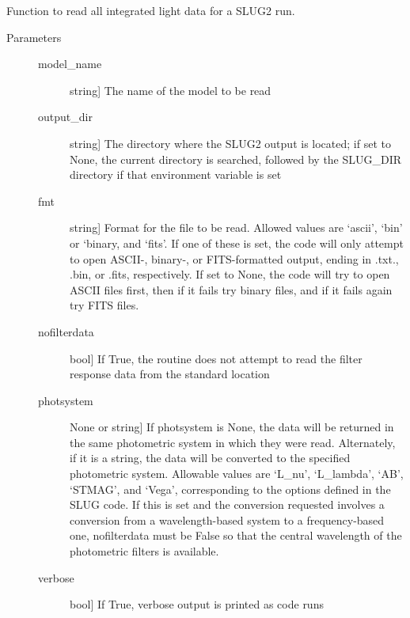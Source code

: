 \documentclass[letterpaper,10pt,english]{sphinxmanual}
\begin{document}

\begin{fulllineitems}
\label{slugpy:slugpy.read_integrated}
Function to read all integrated light data for a SLUG2 run.
\begin{description}
\item[{Parameters}] \leavevmode\begin{description}
\item[{model\_name}] \leavevmode{[}string{]}
The name of the model to be read

\item[{output\_dir}] \leavevmode{[}string{]}
The directory where the SLUG2 output is located; if set to None,
the current directory is searched, followed by the SLUG\_DIR
directory if that environment variable is set

\item[{fmt}] \leavevmode{[}string{]}
Format for the file to be read. Allowed values are `ascii',
`bin' or `binary, and `fits'. If one of these is set, the code
will only attempt to open ASCII-, binary-, or FITS-formatted
output, ending in .txt., .bin, or .fits, respectively. If set
to None, the code will try to open ASCII files first, then if
it fails try binary files, and if it fails again try FITS
files.

\item[{nofilterdata}] \leavevmode{[}bool{]}
If True, the routine does not attempt to read the filter
response data from the standard location

\item[{photsystem}] \leavevmode{[}None or string{]}
If photsystem is None, the data will be returned in the same
photometric system in which they were read. Alternately, if it
is a string, the data will be converted to the specified
photometric system. Allowable values are `L\_nu', `L\_lambda',
`AB', `STMAG', and `Vega', corresponding to the options defined
in the SLUG code. If this is set and the conversion requested
involves a conversion from a wavelength-based system to a
frequency-based one, nofilterdata must be False so that the
central wavelength of the photometric filters is available.

\item[{verbose}] \leavevmode{[}bool{]}
If True, verbose output is printed as code runs


\end{description}
\end{description}
\end{fulllineitems}
\end{document}

